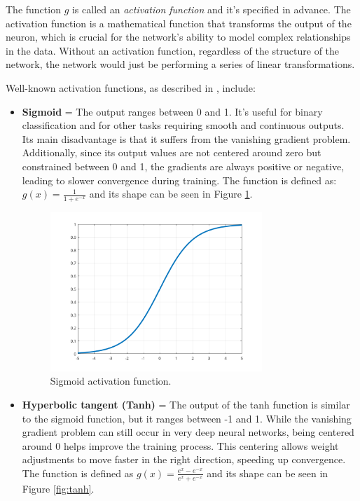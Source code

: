 \documentclass[a4paper,oneside,onecolumn,12pt]{book}
\begin{document}
	The function $g$ is called an \textit{activation function} and it's specified in advance. The activation function is a mathematical function that transforms the output of the neuron, which is crucial for the network's ability to model complex relationships in the data. Without an activation function, regardless of the structure of the network, the network would just be performing a series of linear transformations. \cite{DLP}
	
	Well-known activation functions, as described in \cite{AFNNHCRO}, include:
	\begin{itemize}
		\item \textbf{Sigmoid} = The output ranges between 0 and 1. It's useful for binary classification and for other tasks requiring smooth and continuous outputs. Its main disadvantage is that it suffers from the vanishing gradient problem. Additionally, since its output values are not centered around zero but constrained between 0 and 1, the gradients are always positive or negative, leading to slower convergence during training. The function is defined as: $g(x) = \frac{1}{1 + e^{-x}}$ and its shape can be seen in Figure \ref{fig:sigmoid}.
		\begin{figure}[H]
		\begin{center}
			\includegraphics[keepaspectratio,width=8cm]{kep/sigmoid.png}
			\caption{Sigmoid activation function.}
			\label{fig:sigmoid}
		\end{center}
		\end{figure}
		\item \textbf{Hyperbolic tangent (Tanh)} = The output of the tanh function is similar to the sigmoid function, but it ranges between -1 and 1. While the vanishing gradient problem can still occur in very deep neural networks, being centered around 0 helps improve the training process. This centering allows weight adjustments to move faster in the right direction, speeding up convergence. The function is defined as $g(x) = \frac{e^x - e^{-x}}{e^x + e^{-x}}$ and its shape can be seen in Figure \ref{fig:tanh}.

\end{itemize}
\end{document}
